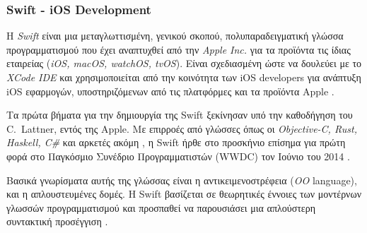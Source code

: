 \subsubsection{Swift - iOS Development}
Η \textit{Swift} είναι μια μεταγλωττισμένη, γενικού σκοπού, πολυπαραδειγματική γλώσσα προγραμματισμού που έχει αναπτυχθεί από την \textit{Apple Inc.} για τα προϊόντα τις ίδιας εταιρείας (\textit{iOS, macOS, watchOS, tvOS}). Είναι σχεδιασμένη ώστε να δουλεύει με το \textit{XCode IDE} και χρησιμοποιείται από την κοινότητα των iOS developers για ανάπτυξη iOS εφαρμογών, υποστηριζόμενων από τις πλατφόρμες και τα προϊόντα Apple \cite{[SWIFT1+16]}.

Τα πρώτα βήματα για την δημιουργία της Swift ξεκίνησαν υπό την καθοδήγηση του C.~Lattner, εντός της Apple. Με επιρροές από γλώσσες όπως οι \textit{Objective-C, Rust, Haskell, C\#} και αρκετές ακόμη \cite{[SWIFT2+14]}, η Swift ήρθε στο προσκήνιο επίσημα για πρώτη φορά στο Παγκόσμιο Συνέδριο Προγραμματιστών (WWDC) τον Ιούνιο του 2014 \cite{[SWIFT3+14]}. 

Βασικά γνωρίσματα αυτής της γλώσσας είναι η αντικειμενοστρέφεια (\textit{OO} language), και η απλουστευμένες δομές. Η Swift βασίζεται σε θεωρητικές έννοιες των μοντέρνων γλωσσών προγραμματισμού και προσπαθεί να παρουσιάσει μια απλούστερη συντακτική προσέγγιση \cite{[SWIFT4], [SWIFT5]}. 

